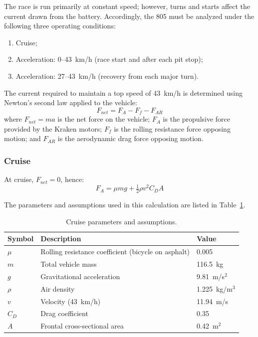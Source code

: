 \documentclass[12pt]{article}
\begin{document}
The race is run primarily at constant speed; however, turns and starts
affect the current drawn from the battery. Accordingly, the 805 must be
analyzed under the following three operating conditions:
\begin{enumerate}
  \item Cruise;
  \item Acceleration: 0--43~km/h (race start and after each pit stop);
  \item Acceleration: 27--43~km/h (recovery from each major turn).
\end{enumerate}

The current required to maintain a top speed of 43~km/h is determined using
Newton's second law applied to the vehicle:
\begin{equation}
  F_{net} = F_A - F_f - F_{AR}
  \label{eq:newton}
\end{equation}
where $F_{net} = ma$ is the net force on the vehicle; $F_A$ is the
propulsive force provided by the Kraken motors; $F_f$ is the rolling
resistance force opposing motion; and $F_{AR}$ is the aerodynamic drag
force opposing motion.

\subsubsection{Cruise}

At cruise, $F_{net} = 0$, hence:
\[
F_A = \mu mg + \tfrac{1}{2}\rho v^2 C_D A
\]

The parameters and assumptions used in this calculation are listed in
Table~\ref{tab:cruise}.

\begin{table}[htbp]
  \centering
  \caption{Cruise parameters and assumptions.}
  \label{tab:cruise}
  \begin{tabular}{lll}
    \toprule
    \textbf{Symbol} & \textbf{Description} & \textbf{Value} \\
    \midrule
    $\mu$  & Rolling resistance coefficient (bicycle on asphalt) & 0.005 \\
    $m$    & Total vehicle mass                                  & 116.5~kg \\
    $g$    & Gravitational acceleration                          & 9.81~m/s$^2$ \\
    $\rho$ & Air density                                          & 1.225~kg/m$^3$ \\
    $v$    & Velocity (43~km/h)                                  & 11.94~m/s \\
    $C_D$  & Drag coefficient                                     & 0.35 \\
    $A$    & Frontal cross-sectional area                         & 0.42~m$^2$ \\
    \bottomrule
  \end{tabular}
\end{table}
\end{document}

